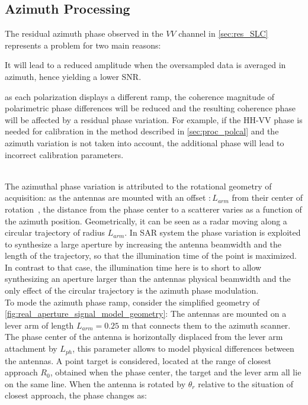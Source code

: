 \subsection{Azimuth Processing}\label{sec:azimuth_processing}
The residual  azimuth phase observed in the $VV$ channel in \autoref{sec:res_SLC} represents a problem for two main reasons: \begin{enumerate*}
	\item It will lead to a reduced amplitude when the oversampled data is averaged in azimuth, hence yielding a lower SNR.
  \item as each polarization displays a different ramp, the coherence magnitude of polarimetric phase differences will be reduced and the resulting coherence phase will be affected by a residual phase variation. For example, if the HH-VV phase is needed for calibration in the method described in \autoref{sec:proc_polcal} and the azimuth variation is not taken into account, the additional phase will lead to incorrect calibration parameters.\label{item:phase_variation}\end{enumerate*}\\
The azimuthal phase variation is attributed to the rotational geometry of acquisition: as the antennas are mounted with an  offset $:L_{arm}$ from their center of rotation~\cite{Lee2014}, the distance from the phase center to a scatterer varies as a function of the azimuth position. Geometrically, it can be seen as a radar moving along a circular trajectory of radius $L_{arm}$. In SAR system the phase variation is exploited to synthesize a large aperture by increasing the antenna beamwidth and the length of the trajectory, so that the illumination time of the point is maximized. In contrast to that case, the illumination time here is to short to allow synthesizing an aperture larger than the antennas physical beamwidth and the only effect of the circular trajectory is the azimuth phase modulation.\\
To mode the azimuth phase ramp, consider the simplified geometry of \autoref{fig:real_aperture_signal_model_geometry}:
The antennas are mounted on a lever arm of length $L_{arm} = 0.25$ m that connects them to the azimuth scanner. The phase center of the antenna is horizontally displaced from the lever arm attachment by $L_{ph}$, this parameter allows to model physical differences between the antennas. A point target is considered, located at the  range of closest approach $R_{0}$, obtained when the phase center, the target and the lever arm all lie on the same line. When the antenna is rotated by $\theta_r$ relative to the situation of closest approach, the phase changes as:
